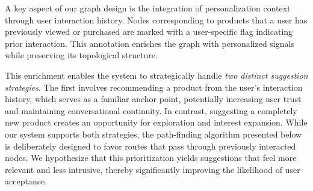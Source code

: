 
A key aspect of our graph design is the integration of personalization context through user interaction history. Nodes corresponding to products that a user has previously viewed or purchased are marked with a user-specific flag indicating prior interaction. This annotation enriches the graph with personalized signals while preserving its topological structure.

This enrichment enables the system to strategically handle \textit{two distinct suggestion strategies}. The first involves recommending a product from the user's interaction history, which serves as a familiar anchor point, potentially increasing user trust and maintaining conversational continuity. In contrast, suggesting a completely new product creates an opportunity for exploration and interest expansion. While our system supports both strategies, the path-finding algorithm presented below is deliberately designed to favor routes that pass through previously interacted nodes. We hypothesize that this prioritization yields suggestions that feel more relevant and less intrusive, thereby significantly improving the likelihood of user acceptance.



